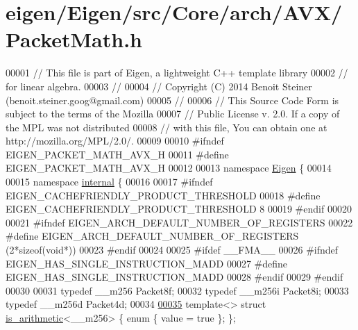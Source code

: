 \hypertarget{eigen_2_eigen_2src_2_core_2arch_2_a_v_x_2_packet_math_8h_source}{}\section{eigen/\+Eigen/src/\+Core/arch/\+A\+V\+X/\+Packet\+Math.h}
\label{eigen_2_eigen_2src_2_core_2arch_2_a_v_x_2_packet_math_8h_source}

\begin{DoxyCode}
00001 \textcolor{comment}{// This file is part of Eigen, a lightweight C++ template library}
00002 \textcolor{comment}{// for linear algebra.}
00003 \textcolor{comment}{//}
00004 \textcolor{comment}{// Copyright (C) 2014 Benoit Steiner (benoit.steiner.goog@gmail.com)}
00005 \textcolor{comment}{//}
00006 \textcolor{comment}{// This Source Code Form is subject to the terms of the Mozilla}
00007 \textcolor{comment}{// Public License v. 2.0. If a copy of the MPL was not distributed}
00008 \textcolor{comment}{// with this file, You can obtain one at http://mozilla.org/MPL/2.0/.}
00009 
00010 \textcolor{preprocessor}{#ifndef EIGEN\_PACKET\_MATH\_AVX\_H}
00011 \textcolor{preprocessor}{#define EIGEN\_PACKET\_MATH\_AVX\_H}
00012 
00013 \textcolor{keyword}{namespace }\hyperlink{namespace_eigen}{Eigen} \{
00014 
00015 \textcolor{keyword}{namespace }\hyperlink{namespaceinternal}{internal} \{
00016 
00017 \textcolor{preprocessor}{#ifndef EIGEN\_CACHEFRIENDLY\_PRODUCT\_THRESHOLD}
00018 \textcolor{preprocessor}{#define EIGEN\_CACHEFRIENDLY\_PRODUCT\_THRESHOLD 8}
00019 \textcolor{preprocessor}{#endif}
00020 
00021 \textcolor{preprocessor}{#ifndef EIGEN\_ARCH\_DEFAULT\_NUMBER\_OF\_REGISTERS}
00022 \textcolor{preprocessor}{#define EIGEN\_ARCH\_DEFAULT\_NUMBER\_OF\_REGISTERS (2*sizeof(void*))}
00023 \textcolor{preprocessor}{#endif}
00024 
00025 \textcolor{preprocessor}{#ifdef \_\_FMA\_\_}
00026 \textcolor{preprocessor}{#ifndef EIGEN\_HAS\_SINGLE\_INSTRUCTION\_MADD}
00027 \textcolor{preprocessor}{#define EIGEN\_HAS\_SINGLE\_INSTRUCTION\_MADD}
00028 \textcolor{preprocessor}{#endif}
00029 \textcolor{preprocessor}{#endif}
00030 
00031 \textcolor{keyword}{typedef} \_\_m256  Packet8f;
00032 \textcolor{keyword}{typedef} \_\_m256i Packet8i;
00033 \textcolor{keyword}{typedef} \_\_m256d Packet4d;
00034 
\hyperlink{struct_eigen_1_1internal_1_1is__arithmetic_3_01____m256_01_4}{00035} \textcolor{keyword}{template}<> \textcolor{keyword}{struct }\hyperlink{struct_eigen_1_1internal_1_1is__arithmetic}{is\_arithmetic}<\_\_m256>  \{ \textcolor{keyword}{enum} \{ value = \textcolor{keyword}{true} \}; \};

\end{DoxyCode}
